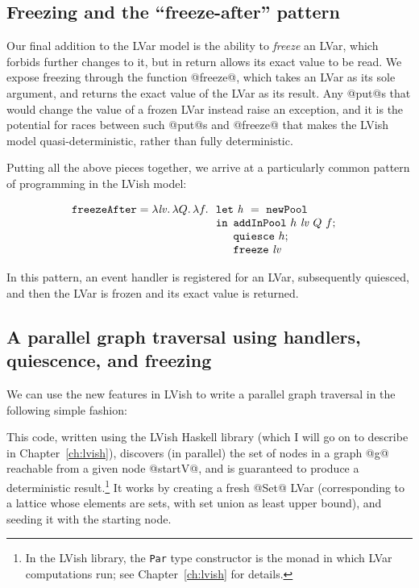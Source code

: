\subsection{Freezing and the ``freeze-after'' pattern}\label{subsection:quasi-freeze-after}

Our final addition to the LVar model is the ability to \emph{freeze}
an LVar, which forbids further changes to it, but in return allows its
exact value to be read.  We expose freezing through the function
@freeze@, which takes an LVar as its sole argument, and returns the
exact value of the LVar as its result.  Any @put@s that would change
the value of a frozen LVar instead raise an exception, and it is the
potential for races between such @put@s and @freeze@ that makes the
LVish model quasi-deterministic, rather than fully deterministic.

Putting all the above pieces together, we arrive at a particularly
common pattern of programming in the LVish model:

\singlespacing
\[
\begin{array}[t]{l}
  \mbox{\texttt{freezeAfter}} = \lambda\mathit{lv}.\,\lambda Q.\,\lambda f.\,
  \begin{array}[t]{l}
    \mbox{\texttt{let}}~\mathit{h}~=~{\mbox{\texttt{newPool}}} \\
    \mbox{\texttt{in}}
      \begin{array}[t]{l}  
        {\mbox{\texttt{addInPool}}}~h~\mathit{lv}~Q~f;
\\
        {\mbox{\texttt{quiesce}}}~h;
\\
        \mbox{\texttt{freeze}}~\mathit{lv}
      \end{array}
  \end{array}
\end{array}
\]
\doublespacing

In this pattern, an event handler is registered for an LVar,
subsequently quiesced, and then the LVar is frozen and its exact value
is returned.

\subsection{A parallel graph traversal using handlers, quiescence, and freezing}\label{subsection:quasi-parallel-graph-traversal}

We can use the new features in LVish to write a parallel graph
traversal in the following simple fashion:

\singlespacing

\doublespacing

This code, written using the LVish Haskell library (which I will go on
to describe in Chapter~\ref{ch:lvish}), discovers (in parallel) the
set of nodes in a graph @g@ reachable from a given node @startV@, and
is guaranteed to produce a deterministic result.\footnote{In the LVish
  library, the \lstinline|Par| type constructor is the monad in which
  LVar computations run; see Chapter~\ref{ch:lvish} for details.}  It
works by creating a fresh @Set@ LVar (corresponding to a lattice whose
elements are sets, with set union as least upper bound), and seeding
it with the starting node.

